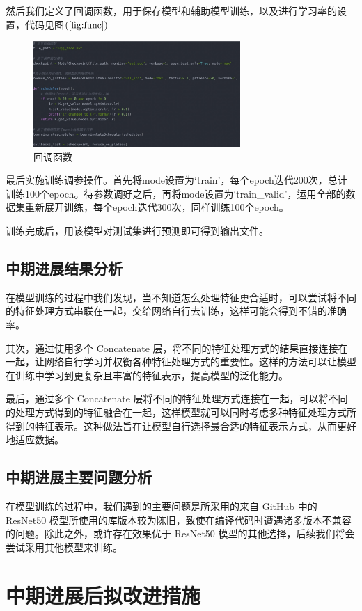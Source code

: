 \documentclass[UTF8]{ctexart}
\begin{document}
然后我们定义了回调函数，用于保存模型和辅助模型训练，以及进行学习率的设置，代码见图$\left(\ref{fig:func}\right)$
\begin{figure}[!ht]
  \centering
  \includegraphics[width=0.7\textwidth]{func.jpg}
  \caption{回调函数}
  \label{fig:func}
\end{figure}

最后实施训练调参操作。首先将mode设置为‘train’，每个epoch迭代200次，总计训练100个epoch。待参数调好之后，再将mode设置为‘train\_valid’，运用全部的数据集重新展开训练，每个epoch迭代300次，同样训练100个epoch。

训练完成后，用该模型对测试集进行预测即可得到输出文件。
\subsection{中期进展结果分析}
在模型训练的过程中我们发现，当不知道怎么处理特征更合适时，可以尝试将不同的特征处理方式串联在一起，交给网络自行去训练，这样可能会得到不错的准确率。

其次，通过使用多个 Concatenate 层，将不同的特征处理方式的结果直接连接在一起，让网络自行学习并权衡各种特征处理方式的重要性。这样的方法可以让模型在训练中学习到更复杂且丰富的特征表示，提高模型的泛化能力。

最后，通过多个 Concatenate 层将不同的特征处理方式连接在一起，可以将不同的处理方式得到的特征融合在一起，这样模型就可以同时考虑多种特征处理方式所得到的特征表示。这种做法旨在让模型自行选择最合适的特征表示方式，从而更好地适应数据。

\subsection{中期进展主要问题分析}
在模型训练的过程中，我们遇到的主要问题是所采用的来自 GitHub 中的 ResNet50 模型所使用的库版本较为陈旧，致使在编译代码时遭遇诸多版本不兼容的问题。除此之外，或许存在效果优于 ResNet50 模型的其他选择，后续我们将会尝试采用其他模型来训练。

\section{中期进展后拟改进措施}
\end{document}
